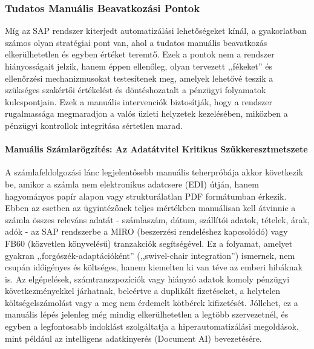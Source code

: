 \subsubsection{Tudatos Manuális Beavatkozási Pontok}

Míg az SAP rendszer kiterjedt automatizálási lehetőségeket kínál, a gyakorlatban számos olyan stratégiai pont van, ahol a tudatos manuális beavatkozás elkerülhetetlen és egyben értéket teremtő.
Ezek a pontok nem a rendszer hiányosságait jelzik, hanem éppen ellenőleg, olyan tervezett ,,fékeket'' és ellenőrzési mechanizmusokat testesítenek meg, amelyek lehetővé teszik a szükséges szakértői értékelést és döntéshozatalt a pénzügyi folyamatok kulcspontjain.
Ezek a manuális intervenciók biztosítják, hogy a rendszer rugalmassága megmaradjon a valós üzleti helyzetek kezelésében, miközben a pénzügyi kontrollok integritása sértetlen marad.

\paragraph{Manuális Számlarögzítés: Az Adatátvitel Kritikus Szűkkeresztmetszete}
A számlafeldolgozási lánc legjelentősebb manuális teherpróbája akkor következik be, amikor a számla nem elektronikus adatcsere (EDI) útján, hanem hagyományos papír alapon vagy strukturálatlan PDF formátumban érkezik.
Ebben az esetben az ügyintézőnek teljes mértékben manuálisan kell átvinnie a számla összes releváns adatát - számlaszám, dátum, szállítói adatok, tételek, árak, adók - az SAP rendszerbe a MIRO (beszerzési rendeléshez kapcsolódó) vagy FB60 (közvetlen könyvelésű) tranzakciók segítségével.
Ez a folyamat, amelyet gyakran ,,forgószék-adaptációként'' (,,swivel-chair integration'') ismernek, nem csupán időigényes és költséges, hanem kiemelten ki van téve az emberi hibáknak is.
Az elgépelések, számtranszpozíciók vagy hiányzó adatok komoly pénzügyi következményekkel járhatnak, beleértve a duplikált fizetéseket, a helytelen költségelszámolást vagy a meg nem érdemelt kötbérek kifizetését.
Jóllehet, ez a manuális lépés jelenleg még mindig elkerülhetetlen a legtöbb szervezetnél, és egyben a legfontosabb indoklást szolgáltatja a hiperautomatizálási megoldások, mint például az intelligens adatkinyerés (Document AI) bevezetésére.

